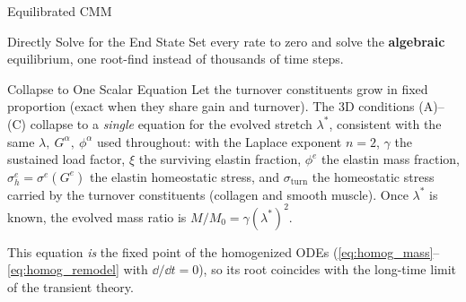 \begin{frame}[t]{}
  \vfill\begin{center}{\Huge\color{YaleBlue} Equilibrated CMM}
  \end{center}\vfill
\end{frame}

\begin{frame}[t]{Directly Solve for the End State}
  Set every rate to zero and solve the \textbf{algebraic} equilibrium, one
  root-find instead of thousands of time steps.
  \vspace{-0.2em}
\end{frame}

\begin{frame}[t]{Collapse to One Scalar Equation}
  Let the turnover constituents grow in fixed proportion (exact when they share
  gain and turnover). The 3D conditions (A)--(C) collapse to a \emph{single}
  equation for the evolved stretch $\lambda^*$, consistent with the same
  $\lambda,\ G^{\alpha},\ \phi^{\alpha}$ used throughout:
  with the Laplace exponent $n=2$, $\gamma$ the sustained load factor, $\xi$ the
  surviving elastin fraction, $\phi^e$ the elastin mass fraction,
  $\sigma_h^e=\sigma^e(G^e)$ the elastin homeostatic stress, and $\sigma_{\text{turn}}$
  the homeostatic stress carried by the turnover constituents (collagen and smooth
  muscle). Once $\lambda^*$ is known, the evolved mass ratio is $M/M_0=\gamma(\lambda^*)^2$.
  \vspace{0.3em}

  This equation \emph{is} the fixed point of the homogenized ODEs (\eqref{eq:homog_mass}--\eqref{eq:homog_remodel} with $\dd/\dd t=0$), so its root coincides with the long-time limit of the transient theory.
\end{frame}

